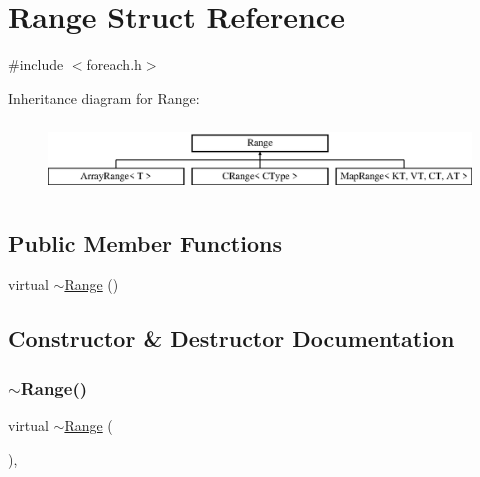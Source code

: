 \hypertarget{struct__fe_1_1Range}{}\section{Range Struct Reference}
\label{struct__fe_1_1Range}


{\ttfamily \#include $<$foreach.\+h$>$}

Inheritance diagram for Range\+:\begin{figure}[H]
\begin{center}
\leavevmode
\includegraphics[height=1.914530cm]{struct__fe_1_1Range}
\end{center}
\end{figure}
\subsection*{Public Member Functions}
\begin{DoxyCompactItemize}
\item 
virtual \mbox{\hyperlink{struct__fe_1_1Range_ae1bf3c80039ff617819f90efbffef16e}{$\sim$\+Range}} ()
\end{DoxyCompactItemize}


\subsection{Constructor \& Destructor Documentation}
\mbox{\label{struct__fe_1_1Range_ae1bf3c80039ff617819f90efbffef16e}} 
\subsubsection{\texorpdfstring{$\sim$\+Range()}{~Range()}}
{\footnotesize\ttfamily virtual $\sim$\mbox{\hyperlink{struct__fe_1_1Range}{Range}} (\begin{DoxyParamCaption}{ }\end{DoxyParamCaption})\hspace{0.3cm}{\ttfamily [inline]}, {\ttfamily [virtual]}}


